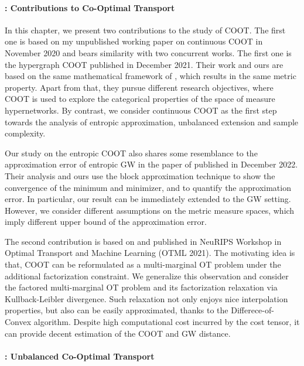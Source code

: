 \paragraph{: Contributions to Co-Optimal Transport}

In this chapter, we present two contributions to the study of COOT.
The first one is based on my unpublished working paper
on continuous COOT in November 2020 and bears similarity with two concurrent works.
The first one is the hypergraph COOT \citep{Chowdhury21b} published in December 2021.
Their work and ours are based on the same mathematical framework of \citep{Chowdhury19},
which results in the same metric property. Apart from that, they pursue different research objectives,
where COOT is used to explore the categorical properties of the space of measure hypernetworks.
By contrast, we consider continuous COOT as the first step towards the analysis of
entropic approximation, unbalanced extension and sample complexity.

Our study on the entropic COOT also shares some resemblance to the approximation error of
entropic GW in the paper of \citep{Zhang23} published in December 2022.
Their analysis and ours use the block approximation technique \citep{Carlier17}
to show the convergence of the minimum and minimizer, and to quantify the approximation error.
In particular, our result can be immediately extended to the GW setting. However,
we consider different assumptions on the metric measure spaces,
which imply different upper bound of the approximation error.

The second contribution is based on \citep{Tran21} and published in NeuRIPS Workshop in Optimal
Transport and Machine Learning (OTML 2021). The motivating idea is that,
COOT can be reformulated as a multi-marginal OT problem under the additional factorization constraint.
We generalize this observation and consider the factored multi-marginal OT problem
and its factorization relaxation via Kullback-Leibler divergence.
Such relaxation not only enjoys nice interpolation properties, but also
can be easily approximated, thanks to the Differece-of-Convex algorithm.
Despite high computational cost incurred by the cost tensor,
it can provide decent estimation of the COOT and GW distance.

\paragraph{: Unbalanced Co-Optimal Transport}

